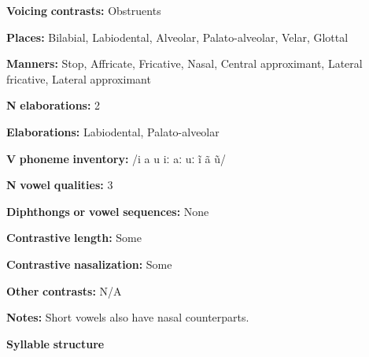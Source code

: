 \begin{styleBody}
\textbf{Voicing} \textbf{contrasts:} Obstruents
\end{styleBody}

\begin{styleBody}
\textbf{Places:} Bilabial, Labiodental, Alveolar, Palato-alveolar, Velar, Glottal
\end{styleBody}

\begin{styleBody}
\textbf{Manners:} Stop, Affricate, Fricative, Nasal, Central approximant, Lateral fricative, Lateral approximant
\end{styleBody}

\begin{styleBody}
\textbf{N} \textbf{elaborations:} 2
\end{styleBody}

\begin{styleBody}
\textbf{Elaborations:} Labiodental, Palato-alveolar
\end{styleBody}

\begin{styleBody}
\textbf{V} \textbf{phoneme} \textbf{inventory:} /i a u iː aː uː ĩ ã ũ/
\end{styleBody}

\begin{styleBody}
\textbf{N} \textbf{vowel} \textbf{qualities:} 3
\end{styleBody}

\begin{styleBody}
\textbf{Diphthongs} \textbf{or} \textbf{vowel} \textbf{sequences:} None
\end{styleBody}

\begin{styleBody}
\textbf{Contrastive} \textbf{length:} Some
\end{styleBody}

\begin{styleBody}
\textbf{Contrastive} \textbf{nasalization:} Some
\end{styleBody}

\begin{styleBody}
\textbf{Other} \textbf{contrasts:} N/A
\end{styleBody}

\begin{styleBody}
\textbf{Notes:} Short vowels also have nasal counterparts.
\end{styleBody}

\begin{styleBody}
\textbf{Syllable} \textbf{structure}
\end{styleBody}

